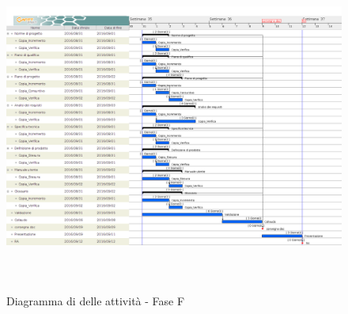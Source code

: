 		\begin{figure}[!h]
			\centering
			\includegraphics[height=11cm, width=15cm]{img/gantt/V} 
			\caption{Diagramma di  delle attività - Fase F}
		\end{figure}
